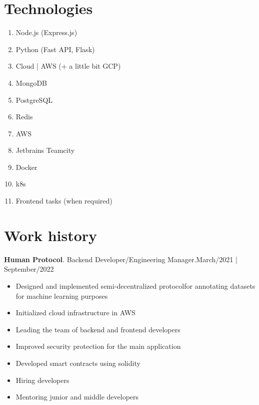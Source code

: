 \documentclass{article}
\begin{document}
\vspace{-2em}
\section*{Technologies}
\begin{multicols}{2}
    \begin{enumerate}
        \item Node.js (Express.js)
        \item Python (Fast API, Flask)
        \item Cloud | AWS (+ a little bit GCP)
        \item MongoDB
        \item PostgreSQL
        \item Redis
        \item AWS
        \item Jetbrains Teamcity
        \item Docker
        \item k8s
        \item Frontend tasks (when required)
    \end{enumerate}
\end{multicols}


\section*{Work history}

\textbf{Human Protocol}. Backend Developer/Engineering Manager.\hspace*{0pt}\hfill March/2021 | September/2022

\begin{itemize}
 \item Designed and implemented semi-decentralized protocolfor annotating datasets for machine learning purposes
 \item Initialized cloud infrastructure in AWS
 \item Leading the team of backend and frontend developers
 \item Improved security protection for the main application
 \item Developed smart contracts using solidity
 \item Hiring developers
 \item Mentoring junior and middle developers
\end{itemize}
\end{document}
